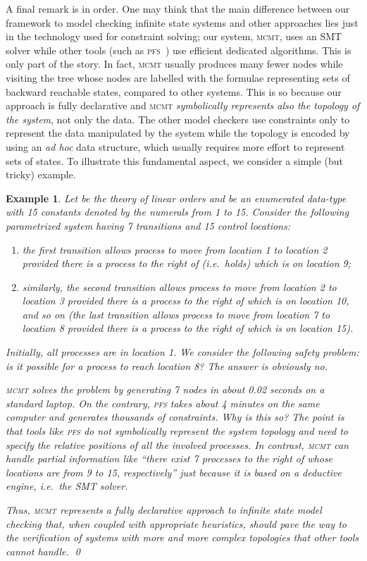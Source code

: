 \documentclass{LMCS}
\theoremstyle{plain}\newtheorem{assumption}[thm]{Assumption}
\theoremstyle{plain}\newtheorem{proposition}[thm]{Proposition}
\theoremstyle{plain}\newtheorem{property}[thm]{Property}
\theoremstyle{plain}\newtheorem{example}[thm]{Example}
\theoremstyle{plain}\newtheorem{claim}[thm]{Claim}
\theoremstyle{plain}\newtheorem{lemma}[thm]{Lemma}
\begin{document}
A final remark is in order.  One may think that the main difference
between our framework to model checking infinite state systems and
other approaches lies just in the technology used for constraint
solving; our system, \textsc{mcmt}, uses an SMT solver while other
tools (such as \textsc{pfs}~\cite{tacas06}) use efficient dedicated
algorithms.
This is only part of the story.  In fact, \textsc{mcmt} usually
produces many fewer nodes while visiting the tree whose nodes are
labelled with the formulae representing sets of backward reachable
states, compared to other systems.  This is so because our approach is
fully declarative and \textsc{mcmt} \emph{symbolically represents also
  the topology of the system}, not only the data.  The other model
checkers use constraints only to represent the data manipulated by the
system while the topology is encoded by using an \emph{ad hoc} data
structure, which usually requires more effort to represent sets of
states.  To illustrate this fundamental aspect, we consider a simple
(but tricky) example.
\begin{example}\em Let  be the theory of linear orders and  be an
  enumerated data-type with 15 constants denoted by the numerals from
  1 to 15.  Consider the following parametrized system having 7
  transitions and 15 control locations:
  \begin{enumerate}[]
  \item the first transition allows process  to move from location
    1 to location 2 provided there is a process  to the right of
     (i.e.\  holds) which is on location 9;
  \item similarly, the second transition allows process  to move
    from location 2 to location 3 provided there is a process  to
    the right of  which is on location 10, and so on (the last
    transition allows process  to move from location 7 to location
    8 provided there is a process  to the right of  which is on
    location 15).
  \end{enumerate}
  Initially, all processes are in location 1.  We consider the
  following safety problem: is it possible for a process to reach
  location 8? The answer is obviously no.

  \textsc{mcmt} solves the problem by generating 7 nodes in about 0.02
  seconds on a standard laptop.
On the contrary, \textsc{pfs} takes about 4 minutes on the same
  computer and generates thousands of constraints.  Why is this so?
  The point is that tools like \textsc{pfs}
do not symbolically represent the system topology and need to
  specify the relative positions of all the involved processes.  In
  contrast, \textsc{mcmt} can handle partial information like ``there
  exist 7 processes to the right of  whose locations are from 9 to
  15, respectively'' just because it is based on a deductive engine,
  i.e.\ the SMT solver.

  Thus, \textsc{mcmt} represents a fully declarative approach to
  infinite state model checking that, when coupled with appropriate
  heuristics, should pave the way to the verification of systems with
  more and more complex topologies that other tools cannot
  handle. \qed
\end{example}
\end{document}
